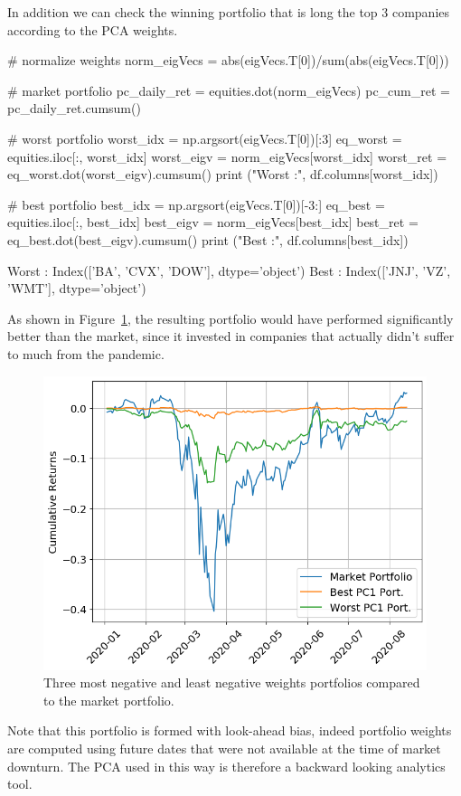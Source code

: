 In addition we can check the winning portfolio that is long the top 3 companies according to the PCA weights.

\begin{ipython}
# normalize weights
norm_eigVecs = abs(eigVecs.T[0])/sum(abs(eigVecs.T[0]))
	
# market portfolio
pc_daily_ret = equities.dot(norm_eigVecs)
pc_cum_ret = pc_daily_ret.cumsum()
	
# worst portfolio
worst_idx = np.argsort(eigVecs.T[0])[:3]
eq_worst = equities.iloc[:, worst_idx]
worst_eigv = norm_eigVecs[worst_idx]
worst_ret = eq_worst.dot(worst_eigv).cumsum()
print ("Worst :", df.columns[worst_idx])
	
# best portfolio         
best_idx = np.argsort(eigVecs.T[0])[-3:]
eq_best = equities.iloc[:, best_idx]
best_eigv = norm_eigVecs[best_idx]
best_ret = eq_best.dot(best_eigv).cumsum()
print ("Best :", df.columns[best_idx])
\end{ipython}
\begin{ioutput}
Worst : Index(['BA', 'CVX', 'DOW'], dtype='object')
Best : Index(['JNJ', 'VZ', 'WMT'], dtype='object')
\end{ioutput}

As shown in Figure~\ref{fig:pca_covid_return}, the resulting portfolio would have performed significantly better than the market, since it invested in companies that actually didn't suffer to much from the pandemic. 

\begin{figure}[bhtp]
\centering
\includegraphics[width=.7\textwidth]{figures/pc1_weights_covid_returns}
\caption{Three most negative and least negative weights portfolios compared to the market portfolio.}
\label{fig:pca_covid_return}
\end{figure}

Note that this portfolio is formed with look-ahead bias, indeed portfolio weights are computed using future dates that were not available at the time of market downturn. The PCA used in this way is therefore a backward looking analytics tool.

